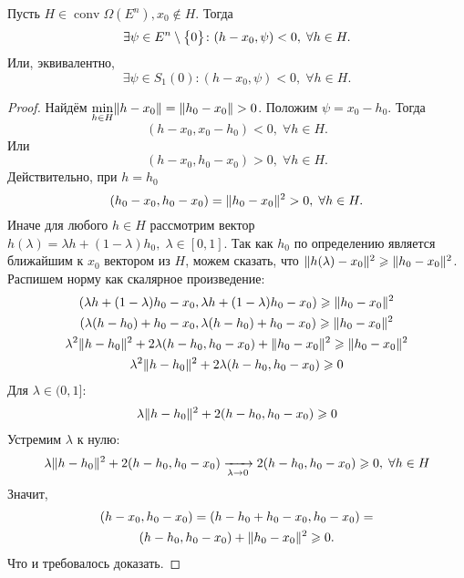 \begin{thm*}
    Пусть $H \in \operatorname{conv}\Omega(E^n), x_0 \notin H$.
    Тогда 
    \begin{equation*}
        \exists \psi \in E^n \setminus \bigl\{ 0 \bigr\} \colon (h - x_0, \psi) < 0, \; \forall h \in H.
    \end{equation*}
    Или, эквивалентно,
    \begin{equation*}
        \exists \psi \in S_1(0)\colon (h - x_0, \psi) < 0, \; \forall h \in H.
    \end{equation*}
\end{thm*}
\begin{proof}
    Найдём $\min\limits_{h \in H} \lVert h - x_0 \rVert = \lVert h_0 - x_0 \rVert > 0$.
    Положим $\psi = x_0 - h_0$.
    Тогда 
    \begin{equation*}
        (h - x_0, x_0 - h_0) < 0, \; \forall h \in H.
    \end{equation*}
    Или 
    \begin{equation*}
        (h - x_0, h_0 - x_0) > 0, \; \forall h \in H.
    \end{equation*}
    Действительно, при $h = h_0$
    \begin{equation*}
        (h_0 - x_0, h_0 - x_0) = \lVert h_0 - x_0 \rVert^2 > 0, \; \forall h \in H.
    \end{equation*}
    Иначе для любого $h \in H$ рассмотрим вектор $h(\lambda) = \lambda h + (1 - \lambda)h_0, \; \lambda \in [0, 1]$.
    Так как $h_0$ по определению является ближайшим к $x_0$ вектором из $H$, можем сказать, что
    $ \lVert h(\lambda) - x_0 \rVert^2 \geqslant \lVert h_0 - x_0 \rVert^2 $.
    Распишем норму как скалярное произведение:
    \begin{gather*}
        (\lambda h + (1-\lambda)h_0 - x_0, \lambda h + (1-\lambda)h_0 - x_0) \geqslant \lVert h_0 - x_0 \rVert^2 \\
        (\lambda (h - h_0) + h_0 - x_0, \lambda (h - h_0) + h_0 - x_0) \geqslant \lVert h_0 - x_0 \rVert^2 \\
        \lambda^2 \lVert h- h_0 \rVert^2 + 2\lambda(h - h_0, h_0 - x_0) + \lVert h_0 - x_0 \rVert^2 \geqslant \lVert h_0 - x_0 \rVert^2 \\
        \lambda^2 \lVert h- h_0 \rVert^2 + 2\lambda(h - h_0, h_0 - x_0) \geqslant 0 \\
    \end{gather*}
    Для $\lambda \in (0, 1]$:
    \begin{gather*}
        \lambda \lVert h- h_0 \rVert^2 + 2(h - h_0, h_0 - x_0) \geqslant 0
    \end{gather*}
    Устремим $\lambda$ к нулю:
    \begin{gather*}
        \lambda \lVert h- h_0 \rVert^2 + 2(h - h_0, h_0 - x_0) \xrightarrow[\lambda \to 0]{} 2(h - h_0, h_0 - x_0) \geqslant 0, \; \forall h \in H
    \end{gather*}
    Значит,
    \begin{gather*}
        (h - x_0, h_0 - x_0) = (h - h_0 + h_0 - x_0, h_0 - x_0) = \\
        (h - h_0, h_0 - x_0) + \lVert h_0 - x_0 \rVert^2 \geqslant 0.
    \end{gather*}
    Что и требовалось доказать.


\end{proof}
